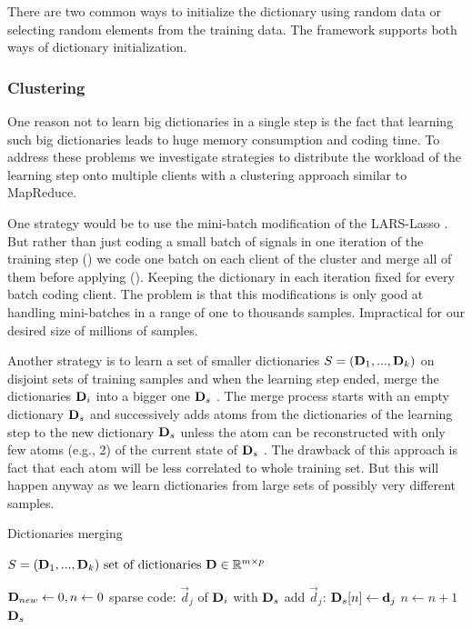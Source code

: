 There are two common ways to initialize the dictionary using random data or
selecting random elements from the training data. The framework supports 
both ways of dictionary initialization. 


\subsubsection{Clustering}
One reason not to learn big dictionaries in a single step is the fact that
learning such big dictionaries leads to huge memory consumption and coding time.
To address these problems we investigate strategies to distribute the workload
of the learning step onto multiple clients with a clustering approach similar to
MapReduce. 

One strategy would be to use the mini-batch
modification of the LARS-Lasso . But rather
than just coding a small batch of signals in one iteration of the training
step () we code one batch on each client of the cluster
and merge all of them before applying (). Keeping the
dictionary in each iteration fixed for every batch coding client. The problem is
that this modifications is only good at handling mini-batches in a range of one
to thousands samples. Impractical for our desired size of millions of samples.

Another strategy is to learn a set of smaller dictionaries $S =
(\boldsymbol{\mathrm{D}}_1, ..., \boldsymbol{\mathrm{D}}_k)$ on disjoint sets of training samples and when
the learning step ended, merge the dictionaries $\boldsymbol{\mathrm{D}}_i$ into a bigger one
$\boldsymbol{\mathrm{D}}_{s}$ . The merge process starts with an empty dictionary
$\boldsymbol{\mathrm{D}}_{s}$  and successively adds atoms from the dictionaries of the
learning step to the new dictionary $\boldsymbol{\mathrm{D}}_{s}$  unless the atom can be
reconstructed with only few atoms (e.g., 2) of the current state of
$\boldsymbol{\mathrm{D}}_{s}$ . The drawback of this approach is fact that 
each atom will be less correlated to whole training set. But this will happen
anyway as we learn dictionaries from large sets of possibly very different
samples. 

\begin{algorithm}[H]
\caption{Dictionaries merging}
\label{alg:merging}
\begin{algorithmic}[1]
\REQUIRE $ S = (\boldsymbol{\mathrm{D}}_1, ..., \boldsymbol{\mathrm{D}}_k) \text{ set of dictionaries } \boldsymbol{\mathrm{D}}
\in \mathbb{R}^{m\times p}$

\STATE $\boldsymbol{\mathrm{D}}_{new} \gets 0, n \gets 0$
\STATE sparse code: $\vec{d}_j$ of $\boldsymbol{\mathrm{D}}_i$ with $\boldsymbol{\mathrm{D}}_{s}$
\STATE add $\vec{d}_j$: $\boldsymbol{\mathrm{D}}_{s}[n] \gets \boldsymbol{\mathrm{d}}_{j}$
\STATE $n \gets n+1$
\ENDIF
\ENDFOR
\ENDFOR
\RETURN $\boldsymbol{\mathrm{D}}_s$
\end{algorithmic}
\end{algorithm}



